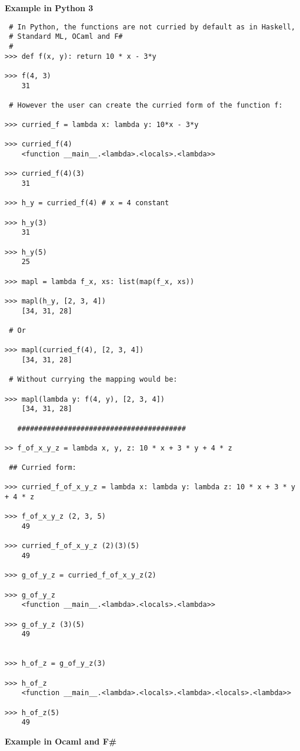 \documentclass[11pt]{article}
\begin{document}
\textbf{Example in Python 3}

\begin{verbatim}
 # In Python, the functions are not curried by default as in Haskell, 
 # Standard ML, OCaml and F#
 #
>>> def f(x, y): return 10 * x - 3*y

>>> f(4, 3)
    31

 # However the user can create the curried form of the function f:

>>> curried_f = lambda x: lambda y: 10*x - 3*y

>>> curried_f(4)
    <function __main__.<lambda>.<locals>.<lambda>>

>>> curried_f(4)(3)
    31

>>> h_y = curried_f(4) # x = 4 constant

>>> h_y(3)
    31

>>> h_y(5)
    25

>>> mapl = lambda f_x, xs: list(map(f_x, xs))

>>> mapl(h_y, [2, 3, 4])
    [34, 31, 28]

 # Or 

>>> mapl(curried_f(4), [2, 3, 4])
    [34, 31, 28]

 # Without currying the mapping would be:

>>> mapl(lambda y: f(4, y), [2, 3, 4])
    [34, 31, 28]

   ########################################

>> f_of_x_y_z = lambda x, y, z: 10 * x + 3 * y + 4 * z

 ## Curried form:
 
>>> curried_f_of_x_y_z = lambda x: lambda y: lambda z: 10 * x + 3 * y + 4 * z

>>> f_of_x_y_z (2, 3, 5)
    49

>>> curried_f_of_x_y_z (2)(3)(5)
    49

>>> g_of_y_z = curried_f_of_x_y_z(2)

>>> g_of_y_z
    <function __main__.<lambda>.<locals>.<lambda>>

>>> g_of_y_z (3)(5)
    49


>>> h_of_z = g_of_y_z(3)

>>> h_of_z
    <function __main__.<lambda>.<locals>.<lambda>.<locals>.<lambda>>

>>> h_of_z(5)
    49
\end{verbatim}

\textbf{Example in Ocaml and F\#}
\end{document}
